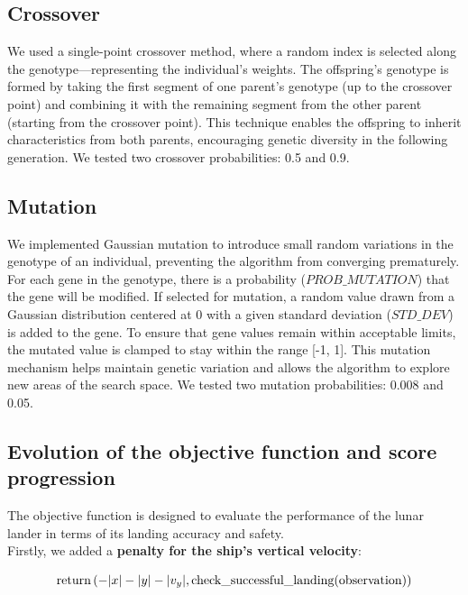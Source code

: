 \documentclass[a4paper, 12pt, fleqn]{report}
\begin{document}
\subsection*{Crossover}
We used a single-point crossover method, where a random index is selected along the genotype—representing the individual's weights. 
The offspring's genotype is formed by taking the first segment of one parent's genotype (up to the crossover point) and combining it with the remaining segment from the other parent (starting from the crossover point). 
This technique enables the offspring to inherit characteristics from both parents, encouraging genetic diversity in the following generation.
We tested two crossover probabilities: 0.5 and 0.9.

\subsection*{Mutation}

We implemented Gaussian mutation to introduce small random variations in the genotype of an individual, preventing the algorithm from converging prematurely. 
For each gene in the genotype, there is a probability ($PROB\_MUTATION$) that the gene will be modified. 
If selected for mutation, a random value drawn from a Gaussian distribution centered at 0 with a given standard deviation ($STD\_DEV$) is added to the gene. 
To ensure that gene values remain within acceptable limits, the mutated value is clamped to stay within the range [-1, 1]. 
This mutation mechanism helps maintain genetic variation and allows the algorithm to explore new areas of the search space.
We tested two mutation probabilities: 0.008 and 0.05.

\newpage
\subsection*{Evolution of the objective function and score progression}
\noindent
The objective function is designed to evaluate the performance of the lunar lander in terms of its landing accuracy and safety.\\
Firstly, we added a \textbf{penalty for the ship's vertical velocity}:

{\scriptsize
\begin{equation}
    \centering
    \text{return} \left( 
        - |x| 
        - |y| 
        - |v_y|, 
        \text{check\_successful\_landing}(\text{observation})
    \right)
\end{equation}
}
\end{document}
